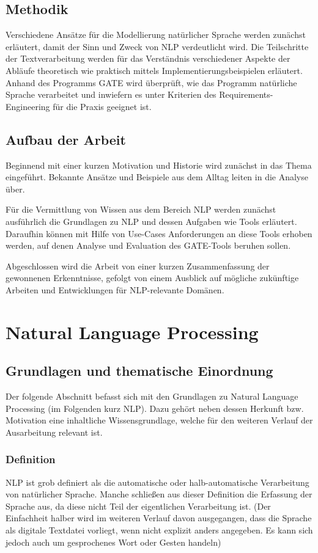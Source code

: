 \documentclass[12pt]{report}
\begin{document}
\section{Methodik}
Verschiedene Ansätze für die Modellierung natürlicher Sprache werden zunächst erläutert, damit der Sinn und Zweck von NLP verdeutlicht wird. Die Teilschritte der Textverarbeitung werden für das Verständnis verschiedener Aspekte der Abläufe theoretisch wie praktisch mittels Implementierungsbeispielen erläutert. Anhand des Programms GATE wird überprüft, wie das Programm natürliche Sprache verarbeitet und inwiefern es unter Kriterien des Requirements-Engineering für die Praxis geeignet ist.

\section{Aufbau der Arbeit}
Beginnend mit einer kurzen Motivation und Historie wird zunächst in das Thema eingeführt. Bekannte Ansätze und Beispiele aus dem Alltag leiten in die Analyse über.

Für die Vermittlung von Wissen aus dem Bereich NLP werden zunächst ausführlich die Grundlagen zu NLP und dessen Aufgaben wie Tools erläutert. Daraufhin können mit Hilfe von Use-Cases Anforderungen an diese Tools erhoben werden, auf denen Analyse und Evaluation des GATE-Tools beruhen sollen. 

Abgeschlossen wird die Arbeit von einer kurzen Zusammenfassung der gewonnenen Erkenntnisse, gefolgt von einem Ausblick auf mögliche zukünftige Arbeiten und Entwicklungen für NLP-relevante Domänen. 

\chapter{Natural Language Processing}
\section{Grundlagen und thematische Einordnung}
Der folgende Abschnitt befasst sich mit den Grundlagen zu Natural Language Processing (im Folgenden kurz NLP). Dazu gehört neben dessen Herkunft bzw. Motivation eine inhaltliche Wissensgrundlage, welche für den weiteren Verlauf der Ausarbeitung relevant ist. 

\subsection{Definition}
NLP ist grob definiert als die automatische oder halb-automatische Verarbeitung von natürlicher Sprache. \cite{cop04} Manche schließen aus dieser Definition die Erfassung der Sprache aus, da diese nicht Teil der eigentlichen Verarbeitung ist. (Der Einfachheit halber wird im weiteren Verlauf davon ausgegangen, dass die Sprache als digitale Textdatei vorliegt, wenn nicht explizit anders angegeben. Es kann sich jedoch auch um gesprochenes Wort oder Gesten handeln)
\end{document}
